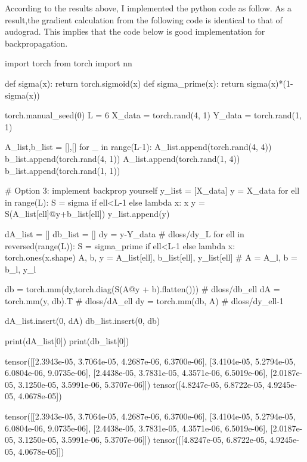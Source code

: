 \documentclass[10pt]{article}
\begin{document}
According to the results above, I implemented the python code as follow. 
As a result,the gradient calculation from the following code is identical to that of audograd. This implies that the code below is good implementation for backpropagation. 
\begin{python}
import torch
from torch import nn

def sigma(x):
    return torch.sigmoid(x)
def sigma_prime(x):
    return sigma(x)*(1-sigma(x))


torch.manual_seed(0)
L = 6
X_data = torch.rand(4, 1)
Y_data = torch.rand(1, 1)

A_list,b_list = [],[]
for _ in range(L-1):
    A_list.append(torch.rand(4, 4))
    b_list.append(torch.rand(4, 1))
A_list.append(torch.rand(1, 4))
b_list.append(torch.rand(1, 1))

# Option 3: implement backprop yourself
y_list = [X_data]
y = X_data
for ell in range(L):
    S = sigma if ell<L-1 else lambda x: x
    y = S(A_list[ell]@y+b_list[ell])
    y_list.append(y)


dA_list = []
db_list = []
dy = y-Y_data  # dloss/dy_L
for ell in reversed(range(L)):
    S = sigma_prime if ell<L-1 else lambda x: torch.ones(x.shape)
    A, b, y = A_list[ell], b_list[ell], y_list[ell] # A = A_l, b = b_l, y_l

    db = torch.mm(dy,torch.diag(S(A@y + b).flatten()))   # dloss/db_ell
    dA = torch.mm(y, db).T   # dloss/dA_ell
    dy = torch.mm(db, A)     # dloss/dy_{ell-1}
    

    dA_list.insert(0, dA)
    db_list.insert(0, db)

print(dA_list[0])
print(db_list[0])
\end{python}
\begin{python}
tensor([[2.3943e-05, 3.7064e-05, 4.2687e-06, 6.3700e-06],
        [3.4104e-05, 5.2794e-05, 6.0804e-06, 9.0735e-06],
        [2.4438e-05, 3.7831e-05, 4.3571e-06, 6.5019e-06],
        [2.0187e-05, 3.1250e-05, 3.5991e-06, 5.3707e-06]])
tensor([4.8247e-05, 6.8722e-05, 4.9245e-05, 4.0678e-05])

tensor([[2.3943e-05, 3.7064e-05, 4.2687e-06, 6.3700e-06],
        [3.4104e-05, 5.2794e-05, 6.0804e-06, 9.0735e-06],
        [2.4438e-05, 3.7831e-05, 4.3571e-06, 6.5019e-06],
        [2.0187e-05, 3.1250e-05, 3.5991e-06, 5.3707e-06]])
tensor([[4.8247e-05, 6.8722e-05, 4.9245e-05, 4.0678e-05]])
\end{python}
\end{document}
